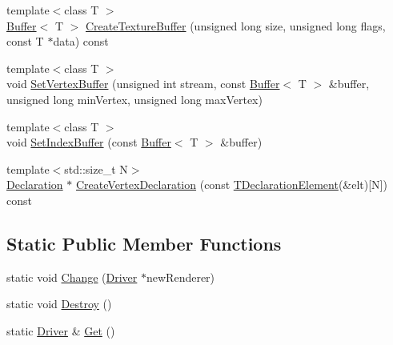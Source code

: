 \begin{DoxyCompactItemize}
{\footnotesize template$<$class T $>$ }\\\hyperlink{class_agmd_1_1_buffer}{Buffer}$<$ T $>$ \hyperlink{class_agmd_1_1_driver_a3bc39deb272f255473fdff8ce31e3ade}{Create\+Texture\+Buffer} (unsigned long size, unsigned long flags, const T $\ast$data) const 
\item 
{\footnotesize template$<$class T $>$ }\\void \hyperlink{class_agmd_1_1_driver_a98eb12fd4fd70f082790b1b43e952cd6}{Set\+Vertex\+Buffer} (unsigned int stream, const \hyperlink{class_agmd_1_1_buffer}{Buffer}$<$ T $>$ \&buffer, unsigned long min\+Vertex, unsigned long max\+Vertex)
\item 
{\footnotesize template$<$class T $>$ }\\void \hyperlink{class_agmd_1_1_driver_a5dccb83b805c97bc4b50c92999055737}{Set\+Index\+Buffer} (const \hyperlink{class_agmd_1_1_buffer}{Buffer}$<$ T $>$ \&buffer)
\item 
{\footnotesize template$<$std\+::size\+\_\+t N$>$ }\\\hyperlink{class_agmd_1_1_declaration}{Declaration} $\ast$ \hyperlink{class_agmd_1_1_driver_a72eb9394e625625f8dfbff52c23a78f8}{Create\+Vertex\+Declaration} (const \hyperlink{struct_agmd_1_1_t_declaration_element}{T\+Declaration\+Element}(\&elt)\mbox{[}N\mbox{]}) const 
\end{DoxyCompactItemize}
\subsection*{Static Public Member Functions}
\begin{DoxyCompactItemize}
\item 
static void \hyperlink{class_agmd_1_1_driver_a0e0c8fdd9df8f038dd42a0c15e763ffa}{Change} (\hyperlink{class_agmd_1_1_driver}{Driver} $\ast$new\+Renderer)
\item 
static void \hyperlink{class_agmd_1_1_driver_a0b25d6cef85fa193a413d193bc26b71a}{Destroy} ()
\item 
static \hyperlink{class_agmd_1_1_driver}{Driver} \& \hyperlink{class_agmd_1_1_driver_aedf84a4d782cbaad6a5d5eb1fd17b682}{Get} ()
\end{DoxyCompactItemize}
